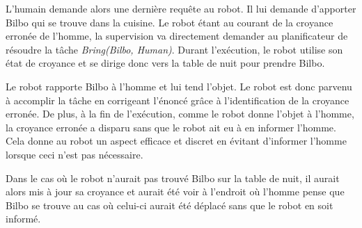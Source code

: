 \documentclass[a4paper,11pt,twoside]{StyleThese}
\begin{document}
L'humain demande alors une dernière requête au robot.
Il lui demande d'apporter Bilbo qui se trouve dans la cuisine.
Le robot étant au courant de la croyance erronée de l'homme, la supervision va directement demander au planificateur de résoudre la tâche \textit{Bring(Bilbo, Human)}. Durant l'exécution, le robot utilise son état de croyance et se dirige donc vers la table de nuit pour prendre Bilbo.

Le robot rapporte Bilbo à l'homme et lui tend l'objet.
Le robot est donc parvenu à accomplir la tâche en corrigeant l'énoncé grâce à l'identification de la croyance erronée. De plus, à la fin de l'exécution, comme le robot donne l'objet à l'homme, la croyance erronée a disparu sans que le robot ait eu à en informer l'homme.
Cela donne au robot un aspect efficace et discret en évitant d'informer l'homme lorsque ceci n'est pas nécessaire.

Dans le cas où le robot n'aurait pas trouvé Bilbo sur la table de nuit, il aurait alors mis à jour sa croyance et aurait été voir à l'endroit où l'homme pense que Bilbo se trouve au cas où celui-ci aurait été déplacé sans que le robot en soit informé.




\end{document}
